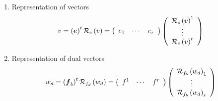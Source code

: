 \documentclass[aps,preprint]{revtex4}%
\begin{document}
\begin{enumerate}
\item Representation of vectors
\begin{equation}
v=\left(  \boldsymbol{e}\right)  ^{t}\mathcal{R}_{e}\left(  v\right)  =\left(
%
\begin{array}
[c]{ccc}%
e_{1} & \cdots & e_{r}%
\end{array}
\right)  \left(
\begin{array}
[c]{c}%
\mathcal{R}_{e}\left(  v\right)  ^{1}\\
\vdots\\
\mathcal{R}_{e}\left(  v\right)  ^{r}%
\end{array}
\right)
\end{equation}


\item Representation of dual vectors%
\begin{equation}
w_{d}=\left(  \boldsymbol{f}_{b}\right)  ^{t}\mathcal{R}_{f_{d}}\left(
w_{d}\right)  =\left(
\begin{array}
[c]{ccc}%
f^{1} & \cdots & f^{r}%
\end{array}
\right)  \left(
\begin{array}
[c]{c}%
\mathcal{R}_{f_{b}}\left(  w_{d}\right)  _{1}\\
\vdots\\
\mathcal{R}_{f_{b}}\left(  w_{d}\right)  _{r}%
\end{array}
\right)
\end{equation}



\end{enumerate}
\end{document}
